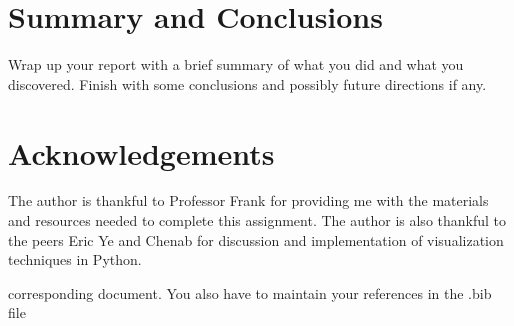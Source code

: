 \documentclass[11pt]{amsart}
\begin{document}
\section{Summary and Conclusions}\label{sec:conclusions}
Wrap up your report with a brief summary of what you did and what you discovered.
Finish with some conclusions and possibly future directions if any.
\section*{Acknowledgements}
The author is thankful to Professor Frank for providing me with the materials and resources needed to complete this assignment. The author is also thankful to the peers Eric Ye and Chenab for discussion and implementation of visualization techniques in Python.

corresponding document. You also have to maintain your references in the .bib file
\end{document}
